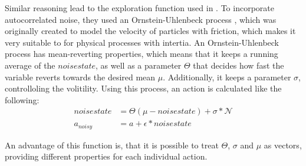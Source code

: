 Similar reasoning lead to the exploration function used in \cite{lillicrap_continuous_2015}. To incorporate autocorrelated noise, they used an Ornstein-Uhlenbeck process \cite{uhlenbeck_theory_1930}, which was originally created to model the velocity of particles with friction, which makes it very suitable to for physical processes with intertia. An Ornstein-Uhlenbeck process has mean-reverting properties, which means that it keeps a running average of the $noisestate$, as well as a parameter $\Theta$ that decides how fast the variable reverts towards the desired mean $\mu$. Additionally, it keeps a parameter $\sigma$, controlloling the volitility. Using this process, an action is calculated like the following:
\begin{align*}
	noisestate &= \Theta (\mu - noisestate) + \sigma * \mathcal{N}\\
	a_{noisy}  &= a + \epsilon * noisestate
\end{align*}

An advantage of this function is, that it is possible to treat $\Theta$, $\sigma$ and $\mu$ as vectors, providing different properties for each individual action.
 
 
